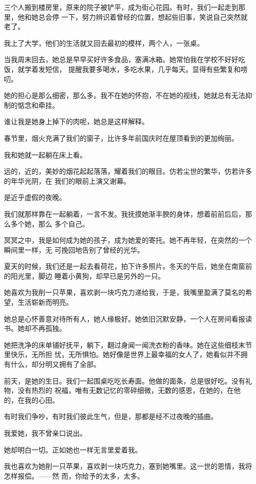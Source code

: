 		三个人搬到楼房里，原来的院子被铲平，成为街心花园。有时，我们一起走到那里，他和她总会停
	一下，努力辨识着曾经的位置，想起些旧事，笑说自己突然就老了。

		我上了大学，他们的生活就又回去最初的模样，两个人，一张桌。

		当我周末回去，她总是早早买好许多食品，塞满冰箱。她常怕我在学校不好好吃饭，就学着发短信，
	提醒我要多喝水，多吃水果，几乎每天。显得有些繁复和唠叨。

		她的担心是那么细密，那么多。我不在她的怀抱，不在她的视线，她就总有无法抑制的惦念和牵挂。

		谁让我是她身上掉下的肉呢，她总是这样解释。

		春节里，烟火充满了我们的窗子，比许多年前国庆时在屋顶看到的更加绚丽。

		我和她就一起躺在床上看。

		远的，近的，美妙的烟花起起落落，耀着我们的眼目。仿若尘世的繁华，仿若许多的年华光阴，在
	我们的眼前上演又谢幕。

		是近乎虚假的夜晚。

		我们就那样靠在一起躺着，一言不发。我抚摸她渐丰腴的身体，想着前前后后，那么多个她，那么
	多个自己。

		冥冥之中，我是如何成为她的孩子，成为她爱的寄托。她不再年轻，在突然的一个瞬间里一样，无
	可挽回地告别了曾经的光华。

		夏天的时候，我们还是一起去看荷花，拍下许多照片。冬天的午后，她坐在南窗前的阳光里，脚边
	睡着小黄狗，却早已是另外的一只。


		她喜欢为我削一只苹果，喜欢剥一块巧克力递给我，于是，我嘴里盈满了莫名的希望，生活崭新而明亮。

		她总是心怀善意对待所有人，她人缘极好。她依旧沉默安静，一个人在房间看报读书。她却不再孤独。


		她把洗净的床单铺好抚平，躺下，翻过身闻一闻洗衣粉的香味。她在这些细枝末节里快乐，无所担
	忧，无所惧怕。她好像是世界上最幸福的女人了，她看似并不拥有什么，却分明又拥有了全部。

		前天，是她的生日。我们一起围桌吃吃长寿面。他做的面条，总是很好吃。没有礼物，没有热烈的
	祝福，唯有无数记忆的零碎细微，无数的感恩，在她的，在他的，在我的心田。


		有时我们争吵，有时我们彼此生气，但是，那都是经不过夜晚的插曲。

		我爱她，我不曾亲口说出。

		她却明白一切。正如她也一样无言里爱着我。


		我也喜欢为她削一只苹果，喜欢剥一块巧克力，塞到她嘴里。这一世的恩情，我将怎样报偿。——然
	而，你给予的太多，太多。


